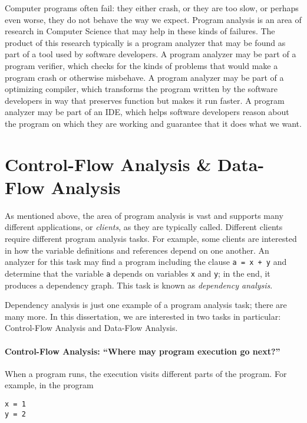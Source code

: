 \documentclass[12pt, oneside]{book}
\begin{document}
Computer programs often fail: they either crash, or they are too slow, or perhaps even worse, they do not behave the way we expect. Program analysis is an area of research in Computer Science that may help in these kinds of failures. The product of this research typically is a program analyzer that may be found as part of a tool used by software developers. A program analyzer may be part of a program verifier, which checks for the kinds of problems that would make a program crash or otherwise misbehave. A program analyzer may be part of a optimizing compiler, which transforms the program written by the software developers in way that preserves function but makes it run faster. A program analyzer may be part of an IDE, which helps software developers reason about the program on which they are working and guarantee that it does what we want.

\section{Control-Flow Analysis \& Data-Flow Analysis}

As mentioned above, the area of program analysis is vast and supports many different applications, or \emph{clients}, as they are typically called. Different clients require different program analysis tasks. For example, some clients are interested in how the variable definitions and references depend on one another. An analyzer for this task may find a program including the clause \texttt{a = x + y} and determine that the variable \texttt{a} depends on variables \texttt{x} and \texttt{y}; in the end, it produces a dependency graph. This task is known as \emph{dependency analysis}.

Dependency analysis is just one example of a program analysis task; there are many more. In this dissertation, we are interested in two tasks in particular: Control-Flow Analysis and Data-Flow Analysis.

\paragraph{Control-Flow Analysis: “Where may program execution go next?”}

When a program runs, the execution visits different parts of the program. For example, in the program

\begin{Verbatim}
x = 1
y = 2
\end{Verbatim}
\end{document}
